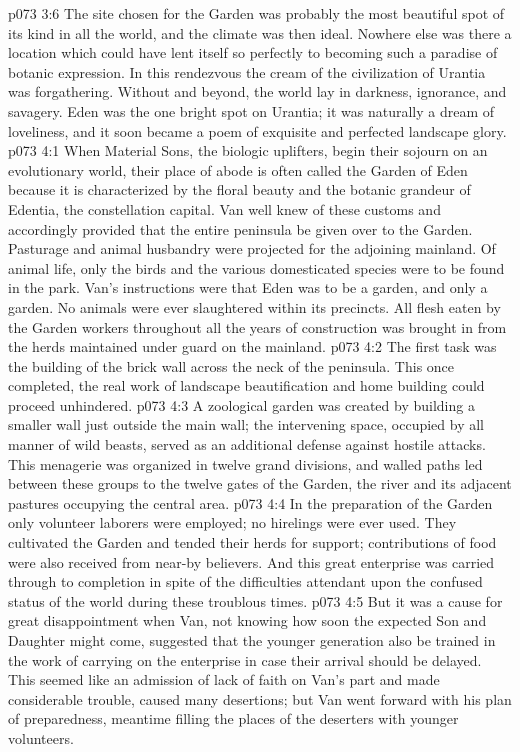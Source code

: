 \vs p073 3:6 The site chosen for the Garden was probably the most beautiful spot of its kind in all the world, and the climate was then ideal. Nowhere else was there a location which could have lent itself so perfectly to becoming such a paradise of botanic expression. In this rendezvous the cream of the civilization of Urantia was forgathering. Without and beyond, the world lay in darkness, ignorance, and savagery. Eden was the one bright spot on Urantia; it was naturally a dream of loveliness, and it soon became a poem of exquisite and perfected landscape glory.
\vs p073 4:1 When Material Sons, the biologic uplifters, begin their sojourn on an evolutionary world, their place of abode is often called the Garden of Eden because it is characterized by the floral beauty and the botanic grandeur of Edentia, the constellation capital. Van well knew of these customs and accordingly provided that the entire peninsula be given over to the Garden. Pasturage and animal husbandry were projected for the adjoining mainland. Of animal life, only the birds and the various domesticated species were to be found in the park. Van’s instructions were that Eden was to be a garden, and only a garden. No animals were ever slaughtered within its precincts. All flesh eaten by the Garden workers throughout all the years of construction was brought in from the herds maintained under guard on the mainland.
\vs p073 4:2 The first task was the building of the brick wall across the neck of the peninsula. This once completed, the real work of landscape beautification and home building could proceed unhindered.
\vs p073 4:3 A zoological garden was created by building a smaller wall just outside the main wall; the intervening space, occupied by all manner of wild beasts, served as an additional defense against hostile attacks. This menagerie was organized in twelve grand divisions, and walled paths led between these groups to the twelve gates of the Garden, the river and its adjacent pastures occupying the central area.
\vs p073 4:4 In the preparation of the Garden only volunteer laborers were employed; no hirelings were ever used. They cultivated the Garden and tended their herds for support; contributions of food were also received from near\hyp{}by believers. And this great enterprise was carried through to completion in spite of the difficulties attendant upon the confused status of the world during these troublous times.
\vs p073 4:5 But it was a cause for great disappointment when Van, not knowing how soon the expected Son and Daughter might come, suggested that the younger generation also be trained in the work of carrying on the enterprise in case their arrival should be delayed. This seemed like an admission of lack of faith on Van’s part and made considerable trouble, caused many desertions; but Van went forward with his plan of preparedness, meantime filling the places of the deserters with younger volunteers.

